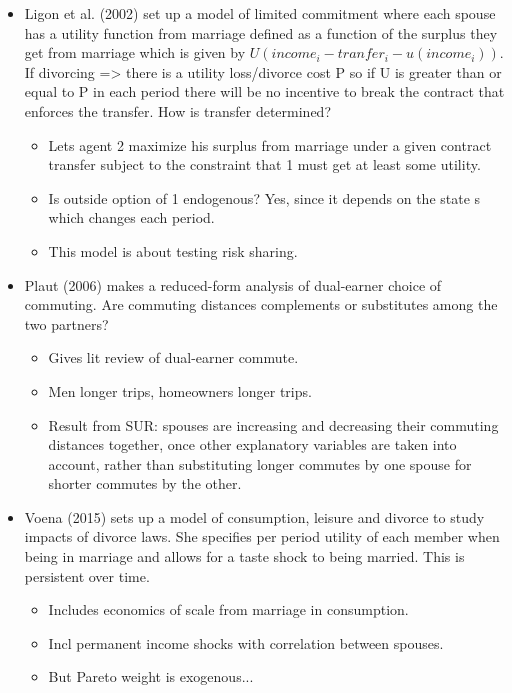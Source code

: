 \begin{itemize}
\begin{itemize}
{without auxiliary functional form assumptions and/or exclusion restrictions.} In general, has a whole section on identification.
\end{itemize}
\item Ligon et al. (2002) set up a model of limited commitment where each spouse has a utility function from marriage defined as a function of the surplus they get from marriage which is given by $U(income_i-tranfer_i-u(income_i))$. If divorcing => there is a utility loss/divorce cost P so if U is greater than or equal to P in each period there will be no incentive to break the contract that enforces the transfer. How is transfer determined?
\begin{itemize}
\item Lets agent 2 maximize his surplus from marriage under a given contract transfer subject to the constraint that 1 must get  at least some utility.
\item Is outside option of 1 endogenous? Yes, since it depends on the state s which changes each period.
\item This model is about testing risk sharing.
\end{itemize}	
\item Plaut (2006) makes a reduced-form analysis of dual-earner choice of commuting. Are commuting distances complements or substitutes among the two partners?
\begin{itemize}
\item Gives lit review of dual-earner commute.
\item Men longer trips, homeowners longer trips.
\item Result from SUR: spouses are increasing and decreasing their commuting distances together, once other explanatory
variables are taken into account, rather than substituting longer commutes by one spouse for shorter commutes by the other.
\end{itemize}	
\item Voena (2015) sets up a model of consumption, leisure and divorce to study impacts of divorce laws. She specifies per period utility of each member when being in marriage and allows for a taste shock to being married. This is persistent over time.	
\begin{itemize}
\item Includes economics of scale from marriage in consumption.
\item Incl permanent income shocks with correlation between spouses.
\item But Pareto weight is exogenous...

\end{itemize}
\end{itemize}
